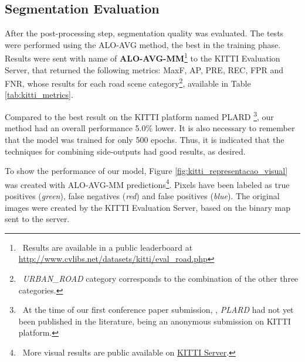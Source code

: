 \subsection{Segmentation Evaluation}
\label{cap6_resultados_segmentacao}

After the post-processing step, segmentation quality was evaluated.
The tests were performed using the ALO-AVG method, the best in the training phase.
Results were sent with name of \textbf{ALO-AVG-MM}\footnote{~Results are available in a public leaderboard at \url{http://www.cvlibs.net/datasets/kitti/eval_road.php}} to the KITTI Evaluation Server, that returned the following metrics: MaxF, AP, PRE, REC, FPR and FNR, whose results for each road scene category\footnote{~\textit{URBAN\_ROAD} category corresponds to the combination of the other three categories.}, available in Table \ref{tab:kitti_metrics}.



{\color{red}
Compared to the best result on the KITTI platform named PLARD \cite{Chen:2019}\footnote{~At the time of our first conference paper submission, \cite{Reis:2019}, \textit{PLARD} had not yet been published in the literature, being an anonymous submission on KITTI platform.}, our method had an overall performance 5.0\% lower.
}
It is also necessary to remember that the model was trained for only 500 epochs.
Thus, it is indicated that the techniques for combining side-outputs had good results, as desired.

To show the performance of our model, Figure \ref{fig:kitti_representacao_visual} was created with ALO-AVG-MM predictions\footnote{~More visual results are public available on \href{http://www.cvlibs.net/datasets/kitti/eval_road_detail.php?result=a5ca173550cb383caf3e12ca236d7c809489d2d9}{KITTI Server}.}.
Pixels have been labeled as true positives (\textit{green}), false negatives (\textit{red}) and false positives (\textit{blue}).
The original images were created by the KITTI Evaluation Server, based on the binary map sent to the server.

